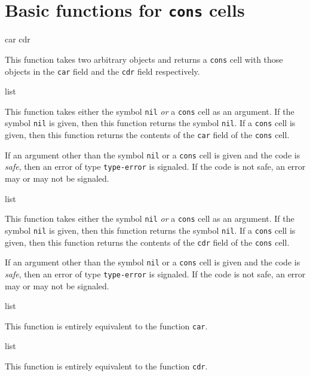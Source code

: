 \chapter{Basic functions for \texttt{cons} cells}
\label{chap-basic-cons-functions}

 {car cdr}

This function takes two arbitrary \lisp{} objects and returns a
\texttt{cons} cell with those objects in the \texttt{car} field and
the \texttt{cdr} field respectively.

 {list}

This function takes either the symbol \texttt{nil} \emph{or} a
\texttt{cons} cell as an argument.  If the symbol \texttt{nil} is
given, then this function returns the symbol \texttt{nil}.  If a
\texttt{cons} cell is given, then this function returns the contents
of the \texttt{car} field of the \texttt{cons} cell.

If an argument other than the symbol \texttt{nil} or a \texttt{cons}
cell is given and the code is \emph{safe}, then an error of type
\texttt{type-error} is signaled.  If the code is not safe, an error
may or may not be signaled. 

 {list}

This function takes either the symbol \texttt{nil} \emph{or} a
\texttt{cons} cell as an argument.  If the symbol \texttt{nil} is
given, then this function returns the symbol \texttt{nil}.  If a
\texttt{cons} cell is given, then this function returns the contents
of the \texttt{cdr} field of the \texttt{cons} cell.

If an argument other than the symbol \texttt{nil} or a \texttt{cons}
cell is given and the code is \emph{safe}, then an error of type
\texttt{type-error} is signaled.  If the code is not safe, an error
may or may not be signaled.

 {list}

This function is entirely equivalent to the function \texttt{car}.

 {list}

This function is entirely equivalent to the function \texttt{cdr}.

